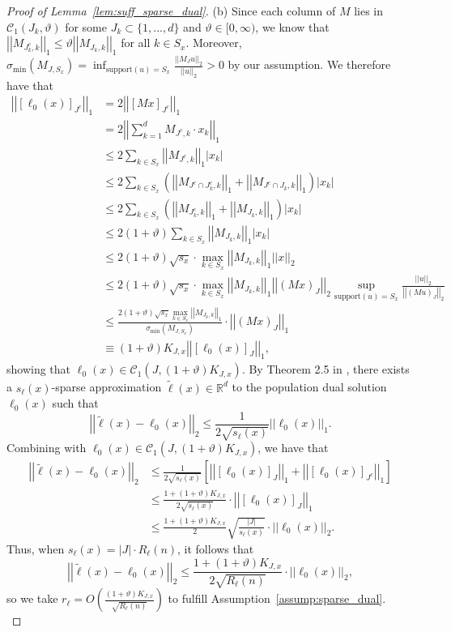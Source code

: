 \documentclass[ejsv2,noshowframe]{imsart}
\theoremstyle{plain}
\theoremstyle{definition}
\theoremstyle{remark}
\newcommand{\norm}[1]{\left|\left| #1 \right|\right|}
\renewcommand{\tilde}{\widetilde}
\begin{document}
\begin{proof}[Proof of Lemma~\ref{lem:suff_sparse_dual}]
	\noindent (b) Since each column of $M$ lies in $\mathcal{C}_1(J_k,\vartheta)$ for some $J_k\subset \{1,...,d\}$ and $\vartheta\in [0,\infty)$, we know that $\norm{M_{J_k^c,k}}_1 \leq \vartheta \norm{M_{J_k,k}}_1$ for all $k\in S_x$. Moreover, $\sigma_{\min}(M_{J,S_x}) = \inf_{\mathrm{support}(u)=S_x} \frac{\norm{M_J u}_2}{\norm{u}_2} >0$ by our assumption. We therefore have that
	\begin{align*}
		\norm{\left[\ell_0(x)\right]_{J^c}}_1 &=2\norm{\left[Mx\right]_{J^c}}_1\\
		&= 2\norm{\sum_{k=1}^d M_{J^c,k} \cdot x_k}_1\\
		&\leq 2\sum_{k\in S_x} \norm{M_{J^c,k}}_1 |x_k|\\
		&\leq 2 \sum_{k\in S_x} \left(\norm{M_{J^c\cap J_k^c,k}}_1 + \norm{M_{J^c\cap J_k,k}}_1 \right) |x_k|\\
		&\leq 2 \sum_{k\in S_x} \left(\norm{M_{J_k^c,k}}_1 + \norm{M_{J_k,k}}_1 \right) |x_k|\\
		&\leq 2(1+\vartheta) \sum_{k\in S_x} \norm{M_{J_k,k}}_1 |x_k|\\
		&\leq 2(1+\vartheta) \sqrt{s_x} \cdot\max_{k\in S_x} \norm{M_{J_k,k}}_1 \norm{x}_2\\
		&\leq  2(1+\vartheta) \sqrt{s_x} \cdot\max_{k\in S_x} \norm{M_{J_k,k}}_1 \norm{(Mx)_J}_2 \sup_{\mathrm{support}(u)=S_x} \frac{\norm{u}_2}{\norm{(M u)_J}_2}\\
		&\leq \frac{2(1+\vartheta) \sqrt{s_x}\max_{k\in S_x} \norm{M_{J_k,k}}_1}{\sigma_{\min}(M_{J,S_x})} \cdot \norm{(Mx)_J}_1\\
		&\equiv (1+\vartheta) K_{J,x}  \norm{\left[\ell_0(x)\right]_{J}}_1,
	\end{align*}
	showing that $\ell_0(x) \in \mathcal{C}_1\left(J, (1+\vartheta) K_{J,x}\right)$. By Theorem 2.5 in \cite{foucart2013mathematical}, there exists a $s_{\ell}(x)$-sparse approximation $\tilde{\ell}(x)\in \mathbb{R}^d$ to the population dual solution $\ell_0(x)$ such that
	$$\norm{\tilde{\ell}(x) -\ell_0(x)}_2 \leq \frac{1}{2\sqrt{s_{\ell}(x)}} \norm{\ell_0(x)}_1.$$
	Combining with $\ell_0(x) \in \mathcal{C}_1\left(J, (1+\vartheta) K_{J,x}\right)$, we have that
	\begin{align*}
		\norm{\tilde{\ell}(x) -\ell_0(x)}_2 &\leq \frac{1}{2\sqrt{s_{\ell}(x)}}\left[ \norm{\left[\ell_0(x)\right]_J}_1 + \norm{\left[\ell_0(x)\right]_{J^c}}_1 \right] \\
		&\leq \frac{1+(1+\vartheta) K_{J,x}}{2\sqrt{s_{\ell}(x)}}\cdot \norm{\left[\ell_0(x)\right]_J}_1\\
		&\leq \frac{1+(1+\vartheta) K_{J,x}}{2} \sqrt{\frac{|J|}{s_{\ell}(x)}} \cdot\norm{\ell_0(x)}_2.
	\end{align*}
	Thus, when $s_{\ell}(x)=|J|\cdot R_{\ell}(n)$, it follows that
	$$\norm{\tilde{\ell}(x) -\ell_0(x)}_2 \leq \frac{1+(1+\vartheta) K_{J,x}}{2\sqrt{R_{\ell}(n)}} \cdot \norm{\ell_0(x)}_2,$$
	so we take $r_{\ell}=O\left(\frac{(1+\vartheta) K_{J,x}}{\sqrt{R_{\ell}(n)}} \right)$ to fulfill Assumption~\ref{assump:sparse_dual}.\\
	

\end{proof}
\end{document}
